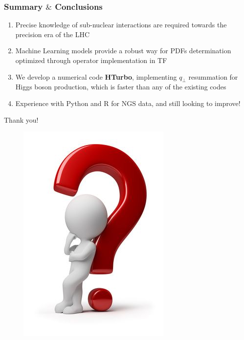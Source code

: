 \documentclass[aspectratio=43]{beamer}
\begin{document}
\begin{frame}
	
	\frametitle{Summary $\&$ Conclusions}

	\vspace{2.0 cm}
	
	\begin{enumerate}
		\item \footnotesize Precise knowledge of sub-nuclear interactions are required towards the precision era of the LHC
		\item \footnotesize Machine Learning models provide a robust way for PDFs determination optimized through {\color{blue}operator implementation in TF}
		\item \footnotesize We develop a numerical code \textbf{HTurbo}, implementing $q_{\perp}$ resummation for Higgs boson production, which is {\color{blue} faster than any of the existing codes}
		\item \footnotesize Experience with Python and R for NGS data, and still looking to improve!

	\end{enumerate}

	\vspace{2.0 cm}

\end{frame}

\begin{frame}

	\center \footnotesize {\color{blue}Thank you!}

	\begin{figure}
		\includegraphics[width = 2.5 cm]{plots/thinking.png}
	\end{figure}		

\end{frame}
\end{document}
